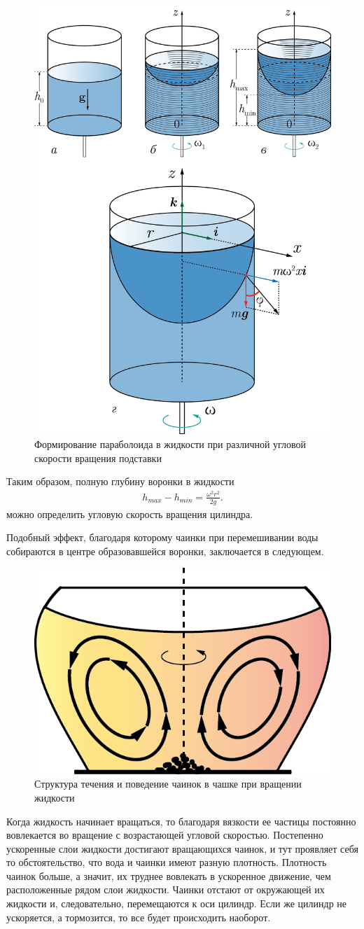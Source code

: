 \documentclass[All.tex]{subfiles}
\begin{document}
\begin{figure}[H] 
	\centering 	
	\includegraphics[width=0.6\linewidth]{paraboloid-3.png}
	\caption{Формирование параболоида в жидкости при различной угловой скорости вращения подставки}
	\label{paraboloid-3}
\end{figure}

Таким образом, полную глубину воронки в жидкости
\begin{align}\label{2}
h_{max} - h_{min}= \frac{\omega^{2} r^{2}}{2g}.
\end{align}
можно определить угловую скорость вращения цилиндра.

Подобный эффект, благодаря которому чаинки при перемешивании воды собираются в центре образовавшейся воронки, заключается в следующем.

\begin{figure}[H]
	\centering 	
	\includegraphics[width=0.45\linewidth]{paraboloid-4.png}
	\caption{Структура течения и поведение чаинок в чашке при вращении жидкости}
	\label{paraboloid-4}
\end{figure}

Когда жидкость начинает вращаться, то благодаря вязкости ее частицы постоянно вовлекается во вращение с возрастающей угловой скоростью. 
Постепенно ускоренные слои жидкости достигают вращающихся чаинок, и тут проявляет себя то обстоятельство, что вода и чаинки имеют разную плотность.
Плотность чаинок больше, а значит, их труднее вовлекать в ускоренное движение, чем расположенные рядом слои жидкости. 
Чаинки отстают от окружающей их жидкости и, следовательно, перемещаются к оси цилиндр.
Если же цилиндр не ускоряется, а тормозится, то все будет происходить наоборот.
\end{document}
